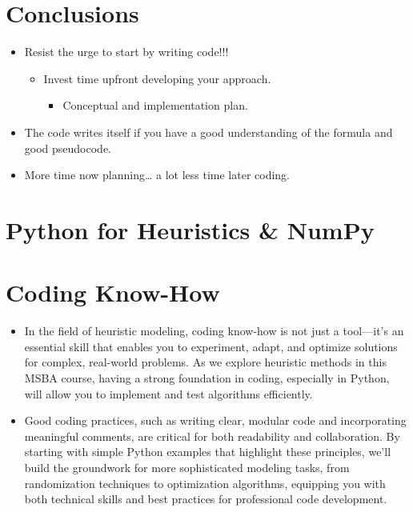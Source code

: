 \documentclass[
  letterpaper,
  DIV=11,
  numbers=noendperiod]{scrreprt}
\providecommand{\tightlist}{%
  \setlength{\itemsep}{0pt}\setlength{\parskip}{0pt}}\usepackage{longtable,booktabs,array}
\begin{document}

\chapter{Conclusions}\label{conclusions}

\begin{itemize}
\tightlist
\item
  Resist the urge to start by writing code!!!

  \begin{itemize}
  \tightlist
  \item
    Invest time upfront developing your approach.

    \begin{itemize}
    \tightlist
    \item
      Conceptual and implementation plan.
    \end{itemize}
  \end{itemize}
\item
  The code writes itself if you have a good understanding of the formula
  and good pseudocode.
\item
  More time now planning\ldots{} a lot less time later coding.
\end{itemize}


\chapter{Python for Heuristics \&
NumPy}\label{python-for-heuristics-numpy}


\chapter{Coding Know-How}\label{coding-know-how}

\begin{itemize}
\tightlist
\item
  In the field of heuristic modeling, coding know-how is not just a
  tool---it's an essential skill that enables you to experiment, adapt,
  and optimize solutions for complex, real-world problems. As we explore
  heuristic methods in this MSBA course, having a strong foundation in
  coding, especially in Python, will allow you to implement and test
  algorithms efficiently.
\item
  Good coding practices, such as writing clear, modular code and
  incorporating meaningful comments, are critical for both readability
  and collaboration. By starting with simple Python examples that
  highlight these principles, we'll build the groundwork for more
  sophisticated modeling tasks, from randomization techniques to
  optimization algorithms, equipping you with both technical skills and
  best practices for professional code development.
\end{itemize}
\end{document}
